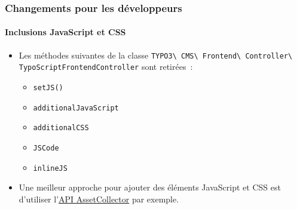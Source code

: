%

\begin{frame}[fragile]
	\frametitle{Changements pour les développeurs}
	\framesubtitle{Inclusions JavaScript et CSS}


	\begin{itemize}
		\item Les méthodes suivantes de la classe
			\smaller\texttt{TYPO3\textbackslash
				CMS\textbackslash
				Frontend\textbackslash
				Controller\textbackslash
				TypoScriptFrontendController}\normalsize\newline
			sont retirées~:

			\begin{itemize}
				\item \texttt{setJS()}
				\item \texttt{additionalJavaScript}
				\item \texttt{additionalCSS}
				\item \texttt{JSCode}
				\item \texttt{inlineJS}
			\end{itemize}

		\item Une meilleur approche pour ajouter des éléments JavaScript et CSS est d'utiliser
			l'\href{https://docs.typo3.org/m/typo3/reference-coreapi/master/en-us/ApiOverview/Assets/Index.html}{API AssetCollector}
			par exemple.
	\end{itemize}

\end{frame}

